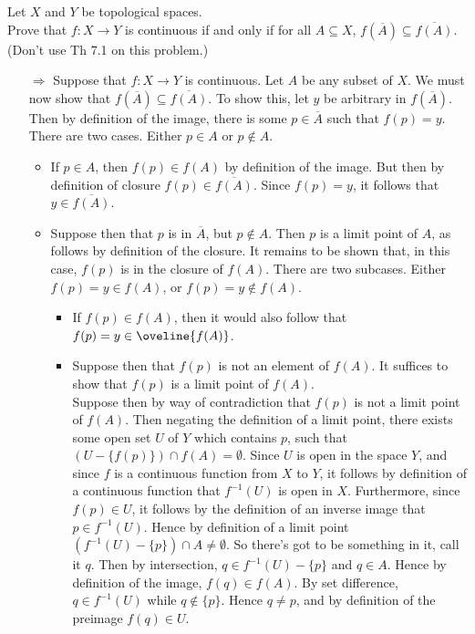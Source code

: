 \documentclass{article}
\newcommand{\inv}[1]{#1^{-1}}
\newcommand{\inv}[1]{#1^{-1}}
\begin{document}
 Let $X$ and $Y$ be topological spaces. \\
Prove that $f: X \rightarrow Y$ is continuous if and only if for all $A \subseteq X$, $f(\overline{A}) \subseteq \overline{f(A)}$.  (Don't use Th 7.1 on this problem.)\\

\begin{itemize}
    \item[$\Rightarrow$]Suppose that $f:X\rightarrow Y$ is continuous. Let $A$ be any subset of $X$. We must now show that $f(\overline{A})\subseteq \overline{f(A)}$. To show this, let $y$ be arbitrary in $f(\overline{A})$. Then by definition of the image, there is some $p\in \overline{A}$ such that $f(p) = y$. There are two cases. Either $p\in A$ or $p\not\in A$. 
    \begin{itemize}
        \item If $p\in A$, then $f(p)\in f(A)$ by definition of the image. But then by definition of closure $f(p)\in \overline{f(A)}$. Since $f(p) = y$, it follows that $y\in \overline{f(A)}$.
        \item Suppose then that $p$ is in $\overline{A}$, but $p\not\in A$. Then $p$ is a limit point of $A$, as follows by definition of the closure. It remains to be shown that, in this case, $f(p)$ is in the closure of $f(A)$. There are two subcases. Either $f(p) = y\in f(A)$, or $f(p) = y\not\in f(A)$.
        \begin{itemize}
            \item  If $f(p)\in f(A)$, then it would also follow that $f(p) = y\in \oveline{f(A)}$.
            \item Suppose then that $f(p)$ is not an element of $f(A)$. It suffices to show that $f(p)$ is a limit point of $f(A)$.\\
            
            Suppose then by way of contradiction that $f(p)$ is not a limit point of $f(A)$. Then negating the definition of a limit point, there exists some open set $U$ of $Y$ which contains $p$, such that $(U- \{f(p)\})\cap f(A) = \emptyset$. Since $U$ is open in the space $Y$, and since $f$ is a continuous function from $X$ to $Y$, it follows by definition of a continuous function that $\inv{f}(U)$ is open in $X$. Furthermore, since $f(p)\in U$, it follows by the definition of an inverse image that $p\in \inv{f}(U)$. Hence by definition of a limit point $ (\inv{f}(U)- \{p\}) \cap A\ne \emptyset $. So there's got to be something in it, call it $q$. Then by intersection, $q\in \inv{f}(U)- \{p\}$ and $q\in A$. Hence by definition of the image, $f(q)\in f(A)$. By set difference, $q\in \inv{f}(U)$ while $q\not\in \{p\}$. Hence $q\ne p$, and by definition of the preimage $f(q)\in U$.\\
            

\end{itemize}
\end{itemize}
\end{itemize}
\end{document}
